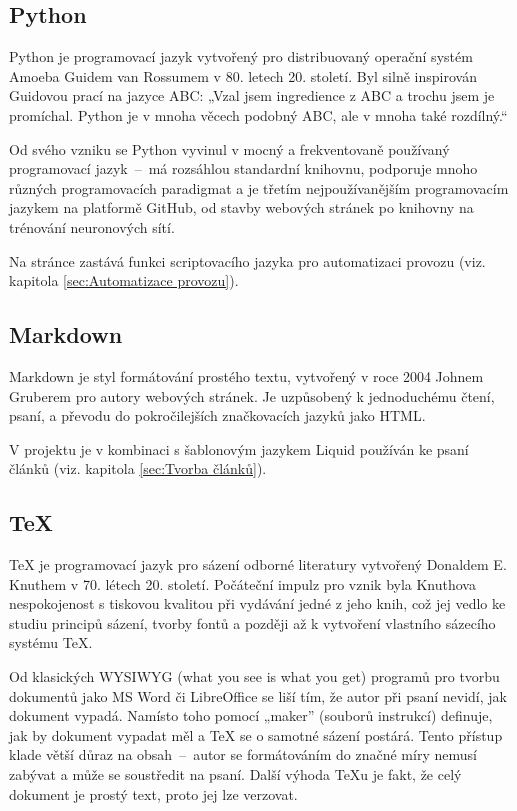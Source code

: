 \documentclass[a4paper, 12pt]{article}
\begin{document}
  \subsection{Python} \label{sec:Python}
  Python je programovací jazyk vytvořený pro distribuovaný operační systém Amoeba Guidem van Rossumem v 80. letech 20. století. Byl silně inspirován Guidovou prací na jazyce ABC: „Vzal jsem ingredience z ABC a trochu jsem je promíchal. Python je v mnoha věcech podobný ABC, ale v mnoha také rozdílný.\cite{making-of-python}“

  Od svého vzniku se Python vyvinul v mocný a frekventovaně používaný programovací jazyk~--~má rozsáhlou standardní knihovnu, podporuje mnoho různých programovacích paradigmat a je třetím nejpoužívanějším programovacím jazykem na platformě GitHub\cite{github-statistics}, od stavby webových stránek po knihovny na trénování neuronových sítí.

  Na stránce zastává funkci scriptovacího jazyka pro automatizaci provozu (viz. kapitola \ref{sec:Automatizace provozu}).


  \subsection{Markdown} \label{sec:Markdown}
  Markdown je styl formátování prostého textu, vytvořený v roce 2004 Johnem Gruberem pro autory webových stránek. Je uzpůsobený k jednoduchému čtení, psaní, a převodu do pokročilejších značkovacích jazyků jako HTML\cite{markdown-history}.

  V projektu je v kombinaci s šablonovým jazykem Liquid používán ke psaní článků (viz. kapitola \ref{sec:Tvorba článků}). %


  \subsection{\TeX} \label{sec:TeX}
  \TeX{} je programovací jazyk pro sázení odborné literatury vytvořený Donaldem E. Knuthem v 70. létech 20. století. Počáteční impulz pro vznik byla Knuthova nespokojenost s tiskovou kvalitou při vydávání jedné z jeho knih, což jej vedlo ke studiu principů sázení, tvorby fontů a později až k vytvoření vlastního sázecího systému \TeX\cite{tex-history}.

  Od klasických WYSIWYG (what you see is what you get) programů pro tvorbu dokumentů jako MS Word či LibreOffice se liší tím, že autor při psaní nevidí, jak dokument vypadá. Namísto toho pomocí „maker” (souborů instrukcí) definuje, jak by dokument vypadat měl a \TeX{} se o samotné sázení postárá. Tento přístup klade větší důraz na obsah~--~autor se formátováním do značné míry nemusí zabývat a může se soustředit na psaní. Další výhoda \TeX u je fakt, že celý dokument je prostý text, proto jej lze verzovat.
\end{document}
